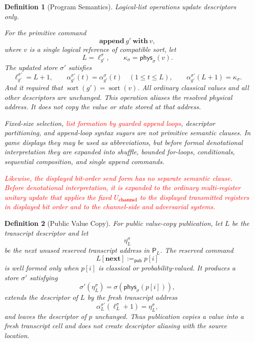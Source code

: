 \documentclass[acmsmall,screen,review,anonymous,nonacm]{acmart}
\newtheorem{definition}{Definition}[section]
\theoremstyle{defn_style}
\begin{document}
\begin{definition}[Program Semantics]
Logical-list operations update descriptors only.

For the primitive command
\[
\mathbf{append}\ g'\ \mathbf{with}\ v,
\]
where \(v\) is a single logical reference of compatible sort, let
\[
L=\ell_{g'}^\sigma,
\qquad
\kappa_\sigma=\mathsf{phys}_\sigma(v).
\]
The updated store \(\sigma'\) satisfies
\[
\ell_{g'}^{\sigma'}=L+1,
\qquad
\alpha_{g'}^{\sigma'}(t)=\alpha_{g'}^\sigma(t)\quad(1\le t\le L),
\qquad
\alpha_{g'}^{\sigma'}(L+1)=\kappa_\sigma.
\]
And it required that \(
\operatorname{sort}(g')=\operatorname{sort}(v)\). All ordinary classical values and all other descriptors are unchanged. This
operation aliases the resolved physical address. It does not copy the value or
state stored at that address.

Fixed-size selection, \textcolor{red}{list formation by guarded append loops}, descriptor partitioning, and append-loop syntax sugars are not primitive semantic clauses. In game displays they may be used as abbreviations, but before formal denotational interpretation they are expanded into shuffle, bounded for-loops, conditionals, sequential composition, and single append commands. 

\textcolor{red}{Likewise, the displayed bit-order send form has no separate semantic clause.  Before denotational interpretation, it is expanded to the ordinary multi-register unitary update that applies the fixed \(U_{\textbf{channel}}\) to the displayed transmitted registers in displayed bit order and to the channel-side and adversarial systems.}

\end{definition}

\begin{definition}[Public Value Copy]
\label{def:public-value-copy}
For public value-copy publication, let \(L\) be the transcript descriptor and
let
\[
\eta_L^\sigma
\]
be the next unused reserved transcript address in \(\mathsf P_L\). The reserved
command
\[
L[\mathbf{next}] :=_{\mathsf{pub}} p[i]
\]
is well formed only when \(p[i]\) is classical or probability-valued. It
produces a store \(\sigma'\) satisfying
\[
\sigma'(\eta_L^\sigma)
=
\sigma(\mathsf{phys}_\sigma(p[i])),
\]
extends the descriptor of \(L\) by the fresh transcript address
\[
\alpha_L^{\sigma'}(\ell_L^\sigma+1)=\eta_L^\sigma,
\]
and leaves the descriptor of \(p\) unchanged. Thus publication copies a value
into a fresh transcript cell and does not create descriptor aliasing with the
source location.
\end{definition}
\end{document}
